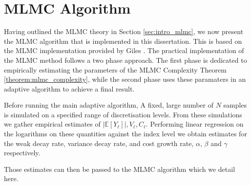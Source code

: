 \section{MLMC Algorithm}\label{sec:mlmc_algorithm}

Having outlined the MLMC theory in Section \ref{sec:intro_mlmc}, we now present 
the MLMC algorithm that is implemented in this dissertation. This is 
based on the MLMC implementation provided by Giles \cite{giles2015multilevel}.
The practical implementation of the MLMC method follows a two phase approach.
The first phase is dedicated to empirically estimating the parameters 
of the MLMC Complexity Theorem \ref{theorem:mlmc_complexity}, while the
second phase uses these paramaters in an adaptive algorithm 
to achieve a final result.

Before running the main adaptive algorithm, A fixed, large number of $N$ 
samples is simulated on a specified range of discretisation levels. From 
these simulations we gather empirical estimates of $|\mathbb{E}[Y_\ell]|, 
V_\ell, C_\ell$. Performing linear regression on the logarithms on these
quantities against the index level we obtain estimates for the weak decay rate,
variance decay rate, and cost growth rate, $\alpha$, $\beta$ and $\gamma$ 
respectively. 

Those estimates can then be passed to the MLMC algorithm which we detail here.

